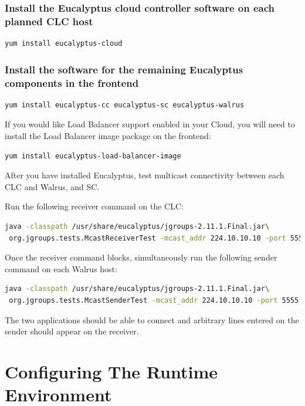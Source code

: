 \subsection{Install the Eucalyptus cloud controller software on each planned CLC host}
\begin{lstlisting}[language=bash]
yum install eucalyptus-cloud
\end{lstlisting}
\subsection{Install the software for the remaining Eucalyptus components in the frontend}
\begin{lstlisting}[language=bash]
yum install eucalyptus-cc eucalyptus-sc eucalyptus-walrus
\end{lstlisting}
If you would like Load Balancer support enabled in your Cloud, you will need to install the Load Balancer image package on the frontend:
\begin{lstlisting}[language=bash]
yum install eucalyptus-load-balancer-image
\end{lstlisting}

After you have installed Eucalyptus, test multicast connectivity between each CLC and Walrus, and SC.
\\ \linebreak

Run the following receiver command on the CLC:
\begin{lstlisting}[language=bash]
java -classpath /usr/share/eucalyptus/jgroups-2.11.1.Final.jar\
 org.jgroups.tests.McastReceiverTest -mcast_addr 224.10.10.10 -port 5555
\end{lstlisting}

Once the receiver command blocks, simultaneously run the following sender command on each Walrus host:
\begin{lstlisting}[language=bash]
java -classpath /usr/share/eucalyptus/jgroups-2.11.1.Final.jar\
 org.jgroups.tests.McastSenderTest -mcast_addr 224.10.10.10 -port 5555
\end{lstlisting}

The two applications should be able to connect and arbitrary lines entered on the sender should appear on the receiver.




\chapter{Configuring The Runtime Environment}

